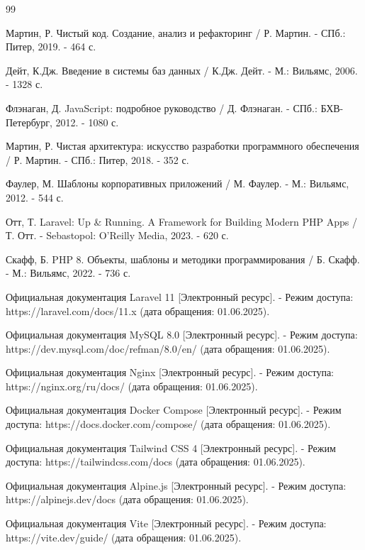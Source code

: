\documentclass[14pt,a4paper]{extreport}
\begin{document}
\newpage
\centeredrefname
\clearpage
{}
\begin{thebibliography}{99}

Мартин, Р. Чистый код. Создание, анализ и рефакторинг / Р. Мартин. -
СПб.: Питер, 2019. - 464 с.

Дейт, К.Дж. Введение в системы баз данных / К.Дж. Дейт. -
М.: Вильямс, 2006. - 1328 с.

Флэнаган, Д. JavaScript: подробное руководство / Д. Флэнаган. -
СПб.: БХВ-Петербург, 2012. - 1080 с.

Мартин, Р. Чистая архитектура: искусство разработки программного обеспечения
/ Р. Мартин. - СПб.: Питер, 2018. - 352 с.

Фаулер, М. Шаблоны корпоративных приложений / М. Фаулер. -
М.: Вильямс, 2012. - 544 с.

Отт, Т. Laravel: Up \& Running. A Framework for Building Modern PHP Apps /
Т. Отт. - Sebastopol: O'Reilly Media, 2023. - 620 с.

Скафф, Б. PHP 8. Объекты, шаблоны и методики программирования / Б. Скафф. -
М.: Вильямс, 2022. - 736 с.

Официальная документация Laravel 11 [Электронный ресурс]. -
Режим доступа: https://laravel.com/docs/11.x (дата обращения: 01.06.2025).

Официальная документация MySQL 8.0 [Электронный ресурс]. -
Режим доступа: https://dev.mysql.com/doc/refman/8.0/en/
(дата обращения: 01.06.2025).

Официальная документация Nginx [Электронный ресурс]. -
Режим доступа: https://nginx.org/ru/docs/ (дата обращения: 01.06.2025).

Официальная документация Docker Compose [Электронный ресурс]. -
Режим доступа: https://docs.docker.com/compose/ (дата обращения: 01.06.2025).

Официальная документация Tailwind CSS 4 [Электронный ресурс]. -
Режим доступа: https://tailwindcss.com/docs (дата обращения: 01.06.2025).

Официальная документация Alpine.js [Электронный ресурс]. -
Режим доступа: https://alpinejs.dev/docs (дата обращения: 01.06.2025).

Официальная документация Vite [Электронный ресурс]. -
Режим доступа: https://vite.dev/guide/ (дата обращения: 01.06.2025).

\end{thebibliography}
\end{document}
